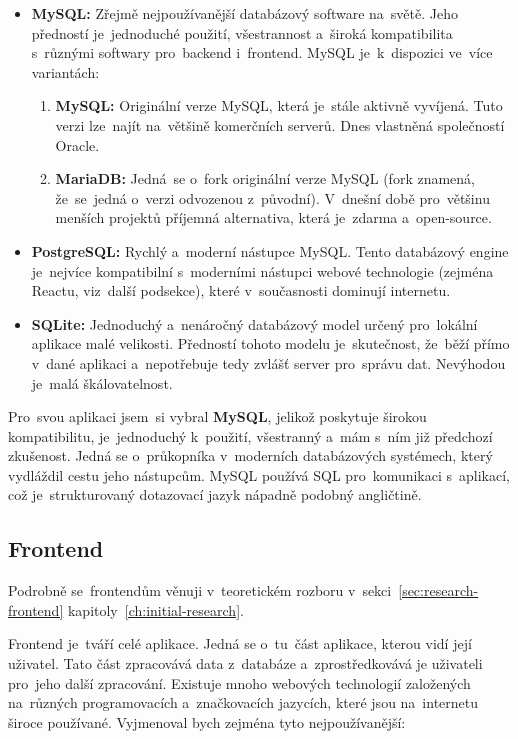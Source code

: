 \begin{itemize}
    \item \textbf{MySQL:} Zřejmě nejpoužívanější databázový software na~světě.
        Jeho předností je~jednoduché použití, všestrannost a~široká
        kompatibilita s~různými softwary pro~backend i~frontend. MySQL
        je~k~dispozici ve~více variantách:
        \begin{enumerate}
            \item \textbf{MySQL:} Originální verze MySQL, která je~stále
                aktivně vyvíjená. Tuto verzi lze~najít na~většině komerčních
                serverů. Dnes vlastněná společností Oracle.
            \item \textbf{MariaDB:} Jedná~se o~fork originální verze MySQL
                (fork znamená, že~se~jedná o~verzi odvozenou z~původní).
                V~dnešní době pro~většinu menších projektů příjemná
                alternativa, která je~zdarma a~open-source.
        \end{enumerate}
    \item \textbf{PostgreSQL:} Rychlý a~moderní nástupce MySQL. Tento
        databázový engine je~nejvíce kompatibilní s~moderními nástupci
        webové technologie (zejména Reactu, viz~další podsekce), které
        v~současnosti dominují internetu.
    \item \textbf{SQLite:} Jednoduchý a~nenáročný databázový model určený
        pro~lokální aplikace malé velikosti. Předností tohoto modelu
        je~skutečnost, že~běží přímo v~dané aplikaci a~nepotřebuje tedy
        zvlášť server pro~správu dat. Nevýhodou je~malá škálovatelnost.
\end{itemize}

Pro~svou aplikaci jsem~si vybral \textbf{MySQL}, jelikož poskytuje širokou
kompatibilitu, je~jednoduchý k~použití, všestranný a~mám s~ním již předchozí
zkušenost. Jedná se o~průkopníka v~moderních databázových systémech, který
vydláždil cestu jeho nástupcům. MySQL používá SQL pro~komunikaci s~aplikací,
což je~strukturovaný dotazovací jazyk nápadně podobný angličtině.

\subsection{Frontend}
\label{sec:preps-frontend}

Podrobně se~frontendům věnuji v~teoretickém rozboru
v~sekci~\ref{sec:research-frontend} kapitoly~\ref{ch:initial-research}.

Frontend je~tváří celé aplikace. Jedná se o~tu~část aplikace, kterou vidí
její uživatel. Tato část zpracovává data z~databáze a~zprostředkovává je
uživateli pro~jeho další zpracování. Existuje mnoho webových technologií
založených na~různých programovacích a~značkovacích jazycích, které jsou
na~internetu široce používané. Vyjmenoval bych zejména tyto nejpoužívanější:

